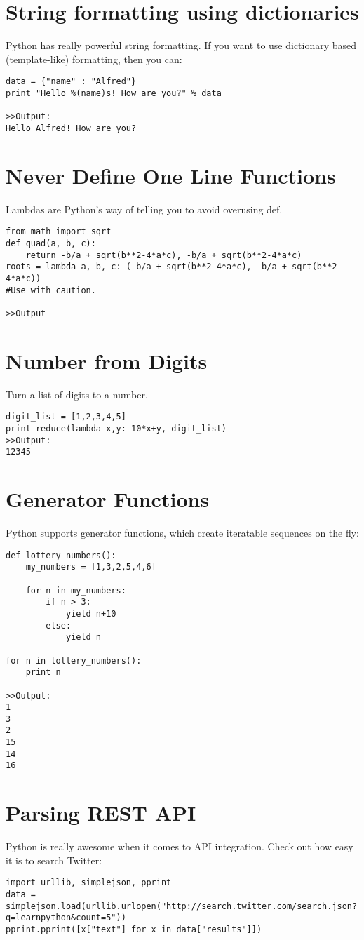 \documentclass[12pt,a4paper,final,twoside,onecolumn,titlepage]{book}
\begin{document}
\section{String formatting using dictionaries}
Python has really powerful string formatting. If you want to use dictionary based (template-like) formatting, then you can:
\begin{lstlisting}
data = {"name" : "Alfred"}
print "Hello %(name)s! How are you?" % data

>>Output:
Hello Alfred! How are you?
\end{lstlisting}

\section{Never Define One Line Functions}
Lambdas are Python's way of telling you to avoid overusing def. 

\begin{lstlisting}
from math import sqrt
def quad(a, b, c):
    return -b/a + sqrt(b**2-4*a*c), -b/a + sqrt(b**2-4*a*c)
roots = lambda a, b, c: (-b/a + sqrt(b**2-4*a*c), -b/a + sqrt(b**2-4*a*c))
#Use with caution.

>>Output
\end{lstlisting}

\section{Number from Digits}
Turn a list of digits to a number.
\begin{lstlisting}
digit_list = [1,2,3,4,5]
print reduce(lambda x,y: 10*x+y, digit_list)
>>Output:
12345
\end{lstlisting}

\section{Generator Functions}
Python supports generator functions, which create iteratable sequences on the fly:
\begin{lstlisting}
def lottery_numbers():
    my_numbers = [1,3,2,5,4,6]

    for n in my_numbers:
        if n > 3:
            yield n+10
        else:
            yield n

for n in lottery_numbers():
    print n

>>Output:
1
3
2
15
14
16
\end{lstlisting}

\section{Parsing REST API}
Python is really awesome when it comes to API integration. Check out how easy it is to search Twitter:
\begin{lstlisting}
import urllib, simplejson, pprint
data = simplejson.load(urllib.urlopen("http://search.twitter.com/search.json?q=learnpython&count=5"))
pprint.pprint([x["text"] for x in data["results"]])
\end{lstlisting}
\end{document}
